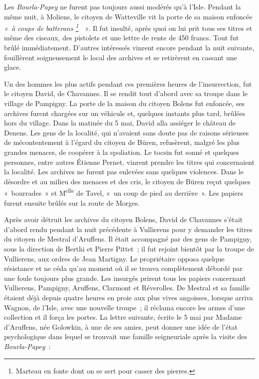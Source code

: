 \documentclass[french,twoside]{book} %
\begin{document}
\noindent Les \emph{Bourla-Papey} ne furent pas toujours aussi modérés qu’à l’Isle. Pendant la même nuit, à Moliens, le citoyen de Watteville vit la porte de sa maison enfoncée \emph{« à coups de batterans \footnote{Marteau en fonte dont on se sert pour casser des pierres.}  »}. Il fut insulté, après quoi on lui prit tous ses titres et même des ciseaux, des pistolets et une lettre de rente de 450 francs. Tout fut brûlé immédiatement. D’autres intéressés vinrent encore pendant la nuit suivante, fouillèrent soigneusement le local des archives et se retirèrent en cassant une glace.\par
Un des hommes les plus actifs pendant ces premières heures de l’insurrection, fut le citoyen David, de Chavannes. Il se rendit tout d’abord avec sa troupe dans le village de Pampigny. La porte de la maison du citoyen Bolens fut enfoncée, ses archives furent chargées sur un véhicule et, quelques instants plus tard, brûlées hors du village. Dans la matinée du 5 mai, David alla assiéger le château de Denens. Les gens de la localité, qui n’avaient sans doute pas de raisons sérieuses de mécontentement à l’égard du citoyen de Büren, refusèrent, malgré les plus grandes menaces, de coopérer à la spoliation. Le tocsin fut sonné et quelques personnes, entre autres Étienne Pernet, vinrent prendre les titres qui concernaient la localité. Les archives ne furent pas enlevées sans quelques violences. Dans le désordre et au milieu des menaces et des cris, le citoyen de Büren reçut quelques « bourrades » et M\textsuperscript{elle} de Tavel, « un coup de pied au derrière ». Les papiers furent ensuite brûlés sur la route de Morges.\par
Après avoir détruit les archives du citoyen Bolens, David de Chavannes s’était d’abord rendu pendant la nuit précédente à Vullierens pour y demander les titres du citoyen de Mestral d’Aruffens. Il était accompagné par des gens de Pampigny, sous la direction de Berthi et Pierre Pittet ; il fut rejoint bientôt par la troupe de Vullierens, aux ordres de Jean Martigny. Le propriétaire opposa quelque résistance et ne céda qu’au moment où il se trouva complètement débordé par une foule toujours plus grande. Les insurgés prirent tous les papiers concernant Vullierens, Pampigny, Aruffens, Clarmont et Réverolles. De Mestral et sa famille étaient déjà depuis quatre heures en proie aux plus vives angoisses, lorsque arriva Wagnon, de l’Isle, avec une nouvelle troupe ; il réclama encore les armes d’une collection et il força les portes. La lettre suivante, écrite le 5 mai par Madame d’Aruffens, née Golowkin, à une de ses amies, peut donner une idée de l’état psychologique dans lequel se trouvait une famille seigneuriale après la visite des \emph{Bourla-Papey} :\par
\end{document}
